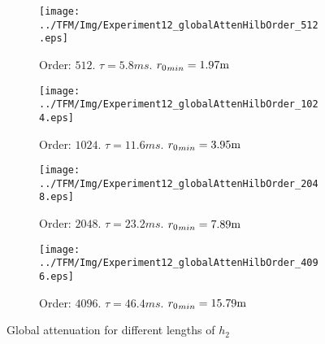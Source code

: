 \begin{figure}[h]
	\centering
	\begin{subfigure}[b]{0.45\textwidth}
		\centering
		\texttt{[image: ../TFM/Img/Experiment12\_globalAttenHilbOrder\_512.eps]}
		\caption{Order: $512$. $\tau = 5.8 \si{ms}$. ${\distLinePrimSource}_{min} = 1.97\si{m}$}
	\end{subfigure}
	\begin{subfigure}[b]{0.45\textwidth}
		\centering
		\texttt{[image: ../TFM/Img/Experiment12\_globalAttenHilbOrder\_1024.eps]}
		\caption{Order: $1024$. $\tau = 11.6 \si{ms}$. ${\distLinePrimSource}_{min} = 3.95\si{m}$}
	\end{subfigure}
	\begin{subfigure}[b]{0.45\textwidth}
		\centering
		\texttt{[image: ../TFM/Img/Experiment12\_globalAttenHilbOrder\_2048.eps]}
		\caption{Order: $2048$. $\tau = 23.2 \si{ms}$. ${\distLinePrimSource}_{min} = 7.89\si{m}$}
	\end{subfigure}
	\begin{subfigure}[b]{0.45\textwidth}
		\centering
		\texttt{[image: ../TFM/Img/Experiment12\_globalAttenHilbOrder\_4096.eps]}
		\caption{Order: $4096$. $\tau = 46.4 \si{ms}$. ${\distLinePrimSource}_{min} = 15.79\si{m}$}
	\end{subfigure}
	
	\caption{Global attenuation for different lengths of $h_2$}
	\label{globCancDifHilFilterLength}
\end{figure}


